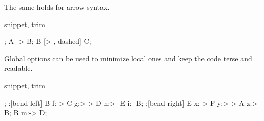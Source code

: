 The same holds for arrow syntax.

\begin{tcblisting}{snippet, trim}
\begin{kodi}
;
\mor A -> B;
\mor B [>-, dashed] C;
\end{kodi}
\end{tcblisting}

Global options can be used to minimize local ones
and keep the code terse and readable.

\begin{tcblisting}{snippet, trim}
\begin{kodi}
;
\mor [swap]:[bend left] B f:-> C g:>-> D h:>- E i:- B;
\mor :[bend right] E x:-> F y:>-> A z:>- B;
\mor [mid] B m:-> D;
\end{kodi}
\end{tcblisting}

\endgroup
